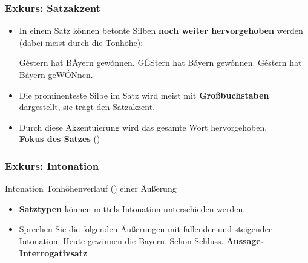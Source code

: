 \begin{frame}
\frametitle{Exkurs: Satzakzent}

\begin{itemize}
\item In einem Satz können betonte Silben \textbf{noch weiter hervorgehoben} werden (dabei meist durch die Tonhöhe):

\eal 
\ex Géstern hat BÁyern gewónnen.
\ex GÉStern hat Báyern gewónnen.
\ex Géstern hat Báyern geWÓNnen.
\zl
\item Die prominenteste Silbe im Satz wird meist mit \textbf{Großbuchstaben} dargestellt, sie trägt den Satzakzent.

\item Durch diese Akzentuierung wird das gesamte Wort
hervorgehoben.\\
\ras \textbf{Fokus des Satzes} ()

\end{itemize}

\end{frame}




\begin{frame}
\frametitle{Exkurs: Intonation}

\begin{block}{Intonation}
Tonhöhenverlauf () einer Äußerung
\end{block}

\begin{itemize}
\item \textbf{Satztypen} können mittels Intonation unterschieden werden.

\item Sprechen Sie die folgenden Äußerungen mit fallender und steigender Intonation.
\eal 
\ex Heute gewinnen die Bayern.
\ex Schon Schluss.
\zl
\pause
\textbf{Aussage-} \vs \textbf{Interrogativsatz}	

\end{itemize}

\end{frame}



